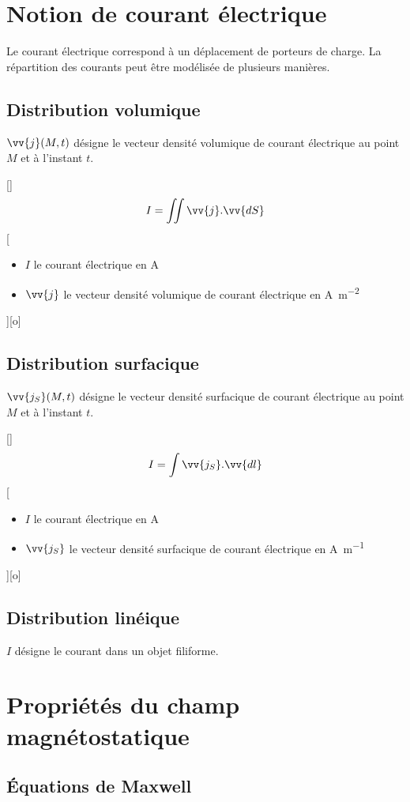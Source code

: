 \section{Notion de courant électrique}
Le courant électrique correspond à un déplacement de porteurs de charge. La répartition des courants peut être modélisée de plusieurs manières.
\subsection{Distribution volumique}
$\vv{j}(M,t)$ désigne le vecteur densité volumique de courant électrique au point $M$ et à l'instant $t$.

[]
{$$I=\iint \vv{j}.\vv{dS}$$}
[
	\begin{itemize}
		\item $I$ le courant électrique en \unit{A}
		\item $\vv{j}$ le vecteur densité volumique de courant électrique en \unit{A.m^{-2}}
	\end{itemize}
][o]

\subsection{Distribution surfacique}
$\vv{j_S}(M,t)$ désigne le vecteur densité surfacique de courant électrique au point $M$ et à l'instant $t$.

[]
{$$I=\int \vv{j_S}.\vv{dl}$$}
[
	\begin{itemize}
		\item $I$ le courant électrique en \unit{A}
		\item $\vv{j_S}$ le vecteur densité surfacique de courant électrique en \unit{A.m^{-1}}
	\end{itemize}
][o]

\subsection{Distribution linéique}
$I$ désigne le courant dans un objet filiforme.

\section{Propriétés du champ magnétostatique}
\subsection{Équations de Maxwell}

